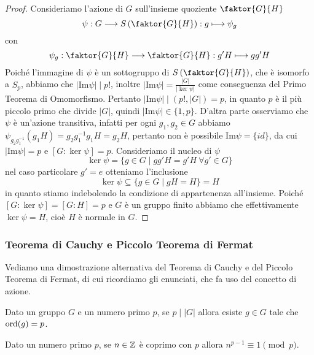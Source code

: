 \documentclass[11pt]{scrartcl}
\begin{document}
\begin{proof}
    Consideriamo l'azione di $G$ sull'insieme quoziente $\faktor{G}{H}$ 
    \[
        \psi: G\longrightarrow S\left(\faktor{G}{H}\right) : g \longmapsto \psi_g
    \]con 
    \[
        \psi_g : \faktor{G}{H}\longrightarrow\faktor{G}{H} : g'H\longmapsto gg'H
    \]Poiché l'immagine di $\psi$ è un sottogruppo di $S\left(\faktor{G}{H}\right)$,
    che è isomorfo a $S_p$, abbiamo che $|\mathrm{Im}\psi| \mid p!$, inoltre 
    $|\mathrm{Im}\psi| = \displaystyle\frac{|G|}{|\ker \psi|}$ come conseguenza
    del Primo Teorema di Omomorfismo. Pertanto $|\mathrm{Im}\psi| \mid (p!, |G|) = p$,
    in quanto $p$ è il più piccolo primo che divide $|G|$, quindi $|\mathrm{Im}\psi| \in \{1, p\}$.
    D'altra parte osserviamo che $\psi$ è un'azione transitiva, infatti per 
    ogni $g_1, g_2 \in G$ abbiamo $\psi_{g_2^{}g_1^{-1}}(g_1H) = g_2g_1^{-1}g_1H = g_2H$,
    pertanto non è possibile $\mathrm{Im}\psi = \{id\}$, da cui $|\mathrm{Im}\psi| = p$
    e $[G:\ker\psi] = p$. Consideriamo il nucleo di $\psi$
    \[
        \ker\psi = \{g\in G\mid gg'H = g'H~\forall g' \in G\}
    \]
    nel caso particolare $g' = e$ otteniamo l'inclusione
    \[
        \ker\psi \subseteq \{g \in G\mid gH = H\} = H
    \]
    in quanto stiamo indebolendo la condizione di appartenenza all'insieme.
    Poiché $[G:\ker \psi] = [G : H] = p$ e $G$ è un gruppo finito abbiamo
    che effettivamente $\ker\psi = H$, cioè $H$ è normale in $G$.
\end{proof}


\subsubsection{Teorema di Cauchy e Piccolo Teorema di Fermat}

Vediamo una dimostrazione alternativa del Teorema di Cauchy e del Piccolo
Teorema di Fermat, di cui ricordiamo gli enunciati, che fa uso del concetto
 di azione. 

\begin{theorem}
    \label{teorema1.0}
    Dato un gruppo $G$ e un numero primo $p$, se $p\mid |G|$ allora esiste 
    $g \in G$ tale che $\operatorname{ord}(g) = p$.
\end{theorem}

\begin{theorem}
    \label{teorema2.0}
    Dato un numero primo $p$, se $n \in \mathbb Z$ è coprimo con $p$ allora 
    $n^{p - 1} \equiv 1 \pmod p$.
\end{theorem}
\end{document}
